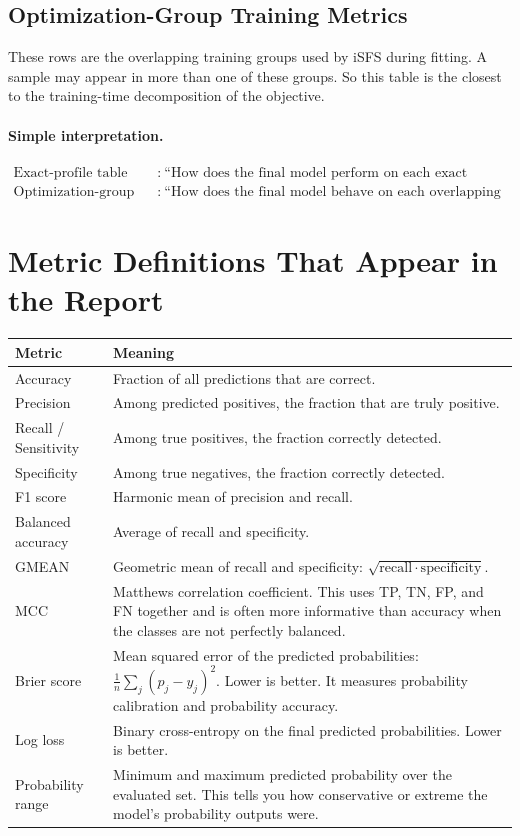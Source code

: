 \documentclass[11pt]{article}
\begin{document}
\subsection{Optimization-Group Training Metrics}
These rows are the overlapping training groups used by iSFS during fitting. A
sample may appear in more than one of these groups. So this table is the
closest to the training-time decomposition of the objective.

\paragraph{Simple interpretation.}
\begin{align*}
\text{Exact-profile table} &:\ \text{``How does the final model perform on each exact missingness pattern?''} \\
\text{Optimization-group table} &:\ \text{``How does the final model behave on each overlapping iSFS training group?''}
\end{align*}

\section{Metric Definitions That Appear in the Report}
\begin{longtable}{>{\raggedright\arraybackslash}p{} >{\raggedright\arraybackslash}p{}}
\toprule
\textbf{Metric} & \textbf{Meaning} \\
\midrule
\endhead
Accuracy & Fraction of all predictions that are correct. \\
Precision & Among predicted positives, the fraction that are truly positive. \\
Recall / Sensitivity & Among true positives, the fraction correctly detected. \\
Specificity & Among true negatives, the fraction correctly detected. \\
F1 score & Harmonic mean of precision and recall. \\
Balanced accuracy & Average of recall and specificity. \\
GMEAN & Geometric mean of recall and specificity: $\sqrt{\mathrm{recall}\cdot\mathrm{specificity}}$. \\
MCC & Matthews correlation coefficient. This uses TP, TN, FP, and FN together and is often more informative than accuracy when the classes are not perfectly balanced. \\
Brier score & Mean squared error of the predicted probabilities:
$\frac{1}{n}\sum_j (\hat{p}_j - y_j)^2$. Lower is better. It measures probability calibration and probability accuracy. \\
Log loss & Binary cross-entropy on the final predicted probabilities. Lower is better. \\
Probability range & Minimum and maximum predicted probability over the evaluated set. This tells you how conservative or extreme the model's probability outputs were. \\
\bottomrule
\end{longtable}
\end{document}

